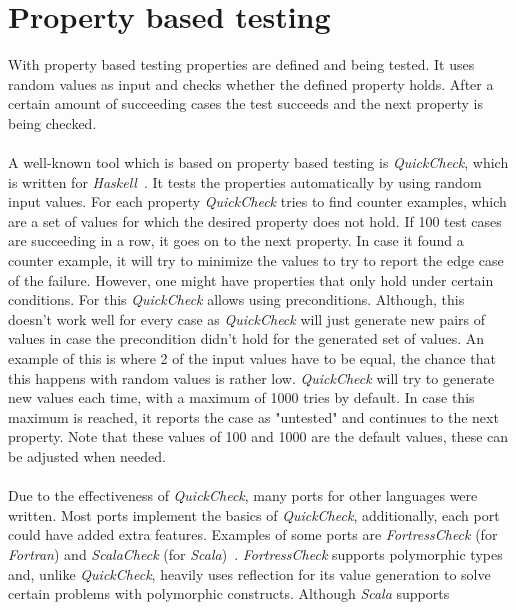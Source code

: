 \section{Property based testing}
With property based testing properties are defined and being tested. It uses random values as input and checks whether the defined property holds. After a certain amount of succeeding cases the test succeeds and the next property is being checked.\\
\\
A well-known tool which is based on property based testing is
\textit{QuickCheck}, which is written for
\textit{Haskell}~\cite{claessen2011quickcheck}. It tests the properties
automatically by using random input values. For each property
\textit{QuickCheck} tries to find counter examples, which are a set of values
for which the desired property does not hold. If 100 test cases are succeeding
in a row, it goes on to the next property. In case it found a counter example,
it will try to minimize the values to try to report the edge case of the
failure. However, one might have properties that only hold under certain
conditions. For this \textit{QuickCheck} allows using preconditions. Although,
this doesn't work well for every case as \textit{QuickCheck} will just generate
new pairs of values in case the precondition didn't hold for the generated set
of values. An example of this is where 2 of the input values have to be equal,
the chance that this happens with random values is rather low.
\textit{QuickCheck} will try to generate new values each time, with a maximum of
1000 tries by default. In case this maximum is reached, it reports the case as
"untested" and continues to the next property. Note that these values of 100 and
1000 are the default values, these can be adjusted when needed.\\
\\
Due to the effectiveness of \textit{QuickCheck}, many ports for other languages
were written. Most ports implement the basics of \textit{QuickCheck},
additionally, each port could have added extra features. Examples of some ports
are \textit{FortressCheck} (for \textit{Fortran}) \cite{kang2011fortresscheck}
and \textit{ScalaCheck} (for \textit{Scala})~\cite{siteScalaCheck2015}.
\textit{FortressCheck} supports polymorphic types and, unlike
\textit{QuickCheck}, heavily uses reflection for its value generation to solve
certain problems with polymorphic constructs. Although \textit{Scala} supports
